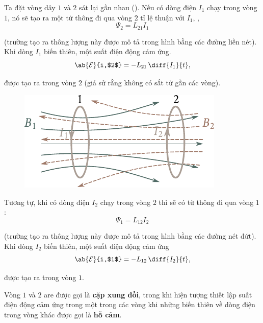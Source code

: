 Ta đặt vòng dây $1$ và $2$ sát lại gần nhau ().
Nếu có dòng điện $I_1$ chạy trong vòng $1$, nó sẽ tạo ra một từ thông đi qua vòng $2$ tỉ lệ thuận với $I_1$, \ie,
\begin{equation}\label{eq:8_26}
	\Psi_2 = L_{21} I_1
\end{equation}

\noindent
(trường tạo ra thông lượng này được mô tả trong hình bằng các đường liền nét).
Khi dòng $I_1$ biến thiên, một suất điện động cảm ứng.
\begin{equation}\label{eq:8_27}
	\ab{\mathcal{E}}{i,$2$} = - L_{21}\, \diff{I_1}{t},
\end{equation}

\noindent
được tạo ra trong vòng $2$ (giả sử rằng không có sắt từ gần các vòng).

\begin{figure}[!h]
	\begin{center}
		\includegraphics[scale=1]{figures/ch_08/fig_8_9.pdf}
		\caption[]{}
		\label{fig:8_9}
	\end{center}
	\vspace{-0.8cm}
\end{figure}

Tương tự, khi có dòng điện $I_2$ chạy trong vòng $2$ thì sẽ có từ thông đi qua vòng $1$:
\begin{equation}\label{eq:8_28}
	\Psi_1 = L_{12} I_2
\end{equation}

\noindent
(trường tạo ra thông lượng này được mô tả trong hình bằng các đường nét đứt).
Khi dòng $I_2$ biến thiên, một suất điện động cảm ứng
\begin{equation}\label{eq:8_29}
	\ab{\mathcal{E}}{i,$1$} = - L_{12}\, \diff{I_2}{t},
\end{equation}

\noindent
được tạo ra trong vòng $1$.

Vòng $1$ và $2$ are được gọi là \textbf{cặp xung đối}, trong khi hiện tượng thiết lập suất điện động cảm ứng trong một trong các vòng khi những biến thiên về dòng điện trong vòng khác được gọi là \textbf{hỗ cảm}.

